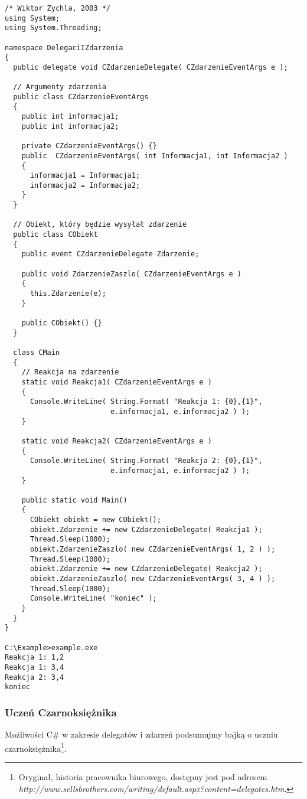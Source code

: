 \begin{scriptsize}
\begin{verbatim}
/* Wiktor Zychla, 2003 */
using System;
using System.Threading;

namespace DelegaciIZdarzenia
{
  public delegate void CZdarzenieDelegate( CZdarzenieEventArgs e );

  // Argumenty zdarzenia
  public class CZdarzenieEventArgs
  {
    public int informacja1;
    public int informacja2;

    private CZdarzenieEventArgs() {}
    public  CZdarzenieEventArgs( int Informacja1, int Informacja2 )
    {
      informacja1 = Informacja1;
      informacja2 = Informacja2;
    }
  }
	
  // Obiekt, który będzie wysyłał zdarzenie
  public class CObiekt
  {
    public event CZdarzenieDelegate Zdarzenie;

    public void ZdarzenieZaszlo( CZdarzenieEventArgs e )
    {
      this.Zdarzenie(e);
    }

    public CObiekt() {}
  }

  class CMain
  {
    // Reakcja na zdarzenie
    static void Reakcja1( CZdarzenieEventArgs e )
    {
      Console.WriteLine( String.Format( "Reakcja 1: {0},{1}", 
                         e.informacja1, e.informacja2 ) );
    }

    static void Reakcja2( CZdarzenieEventArgs e )
    {
      Console.WriteLine( String.Format( "Reakcja 2: {0},{1}", 
                         e.informacja1, e.informacja2 ) );
    }

    public static void Main()
    {
      CObiekt obiekt = new CObiekt();
      obiekt.Zdarzenie += new CZdarzenieDelegate( Reakcja1 );
      Thread.Sleep(1000);
      obiekt.ZdarzenieZaszlo( new CZdarzenieEventArgs( 1, 2 ) );
      Thread.Sleep(1000);
      obiekt.Zdarzenie += new CZdarzenieDelegate( Reakcja2 );
      obiekt.ZdarzenieZaszlo( new CZdarzenieEventArgs( 3, 4 ) );
      Thread.Sleep(1000);
      Console.WriteLine( "koniec" );
    }
  }
}

C:\Example>example.exe
Reakcja 1: 1,2
Reakcja 1: 3,4
Reakcja 2: 3,4
koniec
\end{verbatim}
\end{scriptsize}

\subsubsection{Uczeń Czarnoksiężnika}

Możliwości C\# w zakresie delegatów i zdarzeń podsumujmy bajką o uczniu czarnoksiężnika\footnote{Oryginał,
historia pracownika biurowego, dostępny jest pod adresem 
{\em http://www.sellsbrothers.com/writing/default.aspx?content=delegates.htm}.}. 

